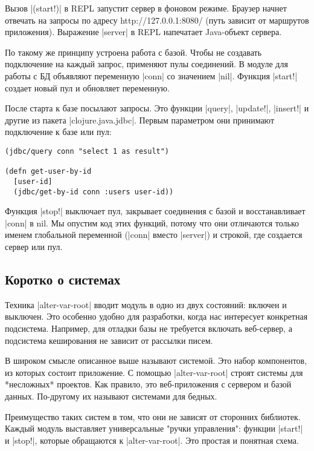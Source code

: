 Вызов \spverb|(start!)| в REPL запустит сервер в фоновом режиме. Браузер начнет
отвечать на запросы по адресу http://127.0.0.1:8080/ (путь зависит от маршрутов
приложения). Выражение \spverb|server| в REPL напечатает Java-объект сервера.

По такому же принципу устроена работа с базой. Чтобы не создавать подключение на
каждый запрос, применяют пулы соединений. В модуле для работы с БД объявляют
переменную \spverb|conn| со значением \spverb|nil|. Функция \spverb|start!| создает новый пул и
обновляет переменную.

После старта к базе посылают запросы. Это функции \spverb|query|, \spverb|update!|, \spverb|insert!|
и другие из пакета \spverb|clojure.java.jdbc|. Первым параметром они принимают
подключение к базе или пул:

\begin{verbatim}
(jdbc/query conn "select 1 as result")

(defn get-user-by-id
  [user-id]
  (jdbc/get-by-id conn :users user-id))
\end{verbatim}

Функция \spverb|stop!| выключает пул, закрывает соединения с базой и восстанавливает
\spverb|conn| в nil. Мы опустим код этих функций, потому что они отличаются только
именем глобальной переменной (\spverb|conn| вместо \spverb|server|) и строкой, где создается
сервер или пул.

\subsection{Коротко о системах}

Техника \spverb|alter-var-root| вводит модуль в одно из двух состояний: включен и
выключен. Это особенно удобно для разработки, когда нас интересует конкретная
подсистема. Например, для отладки базы не требуется включать веб-сервер, а
подсистема кеширования не зависит от рассылки писем.

В широком смысле описанное выше называют системой. Это набор компонентов, из
которых состоит приложение. С помощью \spverb|alter-var-root| строят системы для
*несложных* проектов. Как правило, это веб-приложения с сервером и базой
данных. По-другому их называют системами для бедных.

Преимущество таких систем в том, что они не зависят от сторонних
библиотек. Каждый модуль выставляет универсальные "ручки управления": функции
\spverb|start!| и \spverb|stop!|, которые обращаются к \spverb|alter-var-root|. Это простая и
понятная схема.

